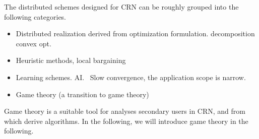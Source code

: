 The distributed schemes designed for CRN can be roughly grouped into the following categories.
\begin{itemize}
\item Distributed realization derived from optimization formulation.
decomposition convex opt.
\item Heuristic methods, local bargaining~\cite{localBargaining_05}
\item Learning schemes. AI.~\cite{resource_allocation_crn_Ahmad_2015}
Slow convergence, the application scope is narrow.
\item Game theory (a transition to game theory)
\end{itemize}

Game theory is a suitable tool for analyses secondary users in CRN, and from which derive algorithms. 
In the following, we will introduce game theory in the following.




















